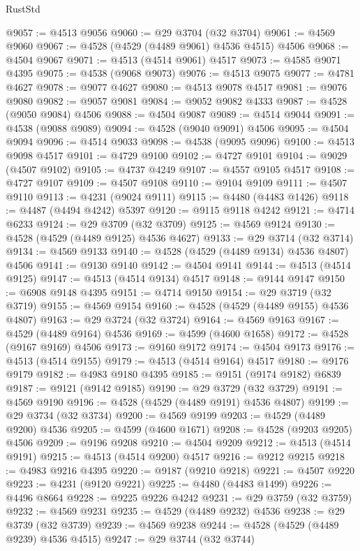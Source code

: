 \begin{lexlean}{RustStd}
\begin{coremodule}
@9057 := @4513 @9056
@9060 := @29 @3704 (@32 @3704)
@9061 := @4569 @9060
@9067 := @4528 (@4529 (@4489 @9061) @4536 @4515) @4506
@9068 := @4504 @9067
@9071 := @4513 (@4514 @9061) @4517
@9073 := @4585 @9071 @4395
@9075 := @4538 (@9068 @9073)
@9076 := @4513 @9075
@9077 := @4781 @4627
@9078 := @9077 @4627
@9080 := @4513 @9078 @4517
@9081 := @9076 @9080
@9082 := @9057 @9081
@9084 := @9052 @9082 @4333
@9087 := @4528 (@9050 @9084) @4506
@9088 := @4504 @9087
@9089 := @4514 @9044
@9091 := @4538 (@9088 @9089)
@9094 := @4528 (@9040 @9091) @4506
@9095 := @4504 @9094
@9096 := @4514 @9033
@9098 := @4538 (@9095 @9096)
@9100 := @4513 @9098 @4517
@9101 := @4729 @9100
@9102 := @4727 @9101
@9104 := @9029 (@4507 @9102)
@9105 := @4737 @4249
@9107 := @4557 @9105 @4517
@9108 := @4727 @9107
@9109 := @4507 @9108
@9110 := @9104 @9109
@9111 := @4507 @9110
@9113 := @4231 (@9024 @9111)
@9115 := @4480 (@4483 @1426)
@9118 := @4487 (@4494 @4242) @5397
@9120 := @9115 @9118 @4242
@9121 := @4714 @6233
@9124 := @29 @3709 (@32 @3709)
@9125 := @4569 @9124
@9130 := @4528 (@4529 (@4489 @9125) @4536 @4627)
@9133 := @29 @3714 (@32 @3714)
@9134 := @4569 @9133
@9140 := @4528 (@4529 (@4489 @9134) @4536 @4807) @4506
@9141 := @9130 @9140
@9142 := @4504 @9141
@9144 := @4513 (@4514 @9125)
@9147 := @4513 (@4514 @9134) @4517
@9148 := @9144 @9147
@9150 := @6908 @9148 @4395
@9151 := @4714 @9150
@9154 := @29 @3719 (@32 @3719)
@9155 := @4569 @9154
@9160 := @4528 (@4529 (@4489 @9155) @4536 @4807)
@9163 := @29 @3724 (@32 @3724)
@9164 := @4569 @9163
@9167 := @4529 (@4489 @9164) @4536
@9169 := @4599 (@4600 @1658)
@9172 := @4528 (@9167 @9169) @4506
@9173 := @9160 @9172
@9174 := @4504 @9173
@9176 := @4513 (@4514 @9155)
@9179 := @4513 (@4514 @9164) @4517
@9180 := @9176 @9179
@9182 := @4983 @9180 @4395
@9185 := @9151 (@9174 @9182) @6839
@9187 := @9121 (@9142 @9185)
@9190 := @29 @3729 (@32 @3729)
@9191 := @4569 @9190
@9196 := @4528 (@4529 (@4489 @9191) @4536 @4807)
@9199 := @29 @3734 (@32 @3734)
@9200 := @4569 @9199
@9203 := @4529 (@4489 @9200) @4536
@9205 := @4599 (@4600 @1671)
@9208 := @4528 (@9203 @9205) @4506
@9209 := @9196 @9208
@9210 := @4504 @9209
@9212 := @4513 (@4514 @9191)
@9215 := @4513 (@4514 @9200) @4517
@9216 := @9212 @9215
@9218 := @4983 @9216 @4395
@9220 := @9187 (@9210 @9218)
@9221 := @4507 @9220
@9223 := @4231 (@9120 @9221)
@9225 := @4480 (@4483 @1499)
@9226 := @4496 @8664
@9228 := @9225 @9226 @4242
@9231 := @29 @3759 (@32 @3759)
@9232 := @4569 @9231
@9235 := @4529 (@4489 @9232) @4536
@9238 := @29 @3739 (@32 @3739)
@9239 := @4569 @9238
@9244 := @4528 (@4529 (@4489 @9239) @4536 @4515)
@9247 := @29 @3744 (@32 @3744)

\end{coremodule}
\end{lexlean}
